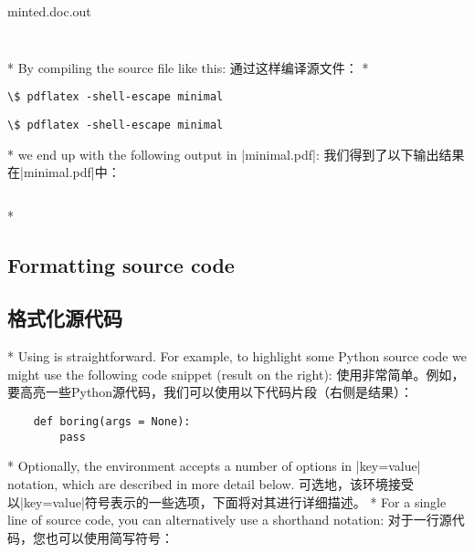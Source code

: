 \begin{paracol}{2}
\begin{VerbatimOut}[gobble=1]{minted.doc.out}
\end{VerbatimOut}
\inputminted[frame=lines]{latex}{minted.doc.out}
\switchcolumn
\inputminted[frame=lines]{latex}{minted.doc.out}
\switchcolumn[0]*%
By compiling the source file like this:
\switchcolumn
通过这样编译源文件：
\switchcolumn[0]*%
\begin{Verbatim}[commandchars=\\\{\}]
\$ pdflatex -shell-escape minimal
\end{Verbatim}
\switchcolumn
\begin{Verbatim}[commandchars=\\\{\}]
\$ pdflatex -shell-escape minimal
\end{Verbatim}
\switchcolumn[0]*%
we end up with the following output in |minimal.pdf|:
\switchcolumn
我们得到了以下输出结果在|minimal.pdf|中：
\end{paracol}

\hfill
\colorbox{minted@samplebg}{\begin{minipage}{0.6\textwidth}
    \inputminted[firstline=7,lastline=10]{c}{minted.doc.out}
\end{minipage}}
\hfill\hfill



\begin{paracol}{2}
\switchcolumn[0]*%
\subsection{Formatting source code}
\switchcolumn
\subsection{格式化源代码}
\switchcolumn[0]*%
Using  is straightforward. For example, to highlight some Python source code we might use
the following code snippet (result on the right):
\switchcolumn
{}
使用非常简单。例如，要高亮一些Python源代码，我们可以使用以下代码片段（右侧是结果）：

\end{paracol}

\begin{example}
    \begin{verbatim}
    def boring(args = None):
        pass
    \end{verbatim}
\end{example}

\begin{paracol}{2}
\switchcolumn[0]*%
Optionally, the environment accepts a number of options in |key=value| notation, which are described
in more detail below.
\switchcolumn
可选地，该环境接受以|key=value|符号表示的一些选项，下面将对其进行详细描述。
\switchcolumn[0]*%
\DescribeMacro{\mint}
For a single line of source code, you can alternatively use a shorthand notation:
\switchcolumn
\DescribeMacro{\mint}
对于一行源代码，您也可以使用简写符号：
\end{paracol}

